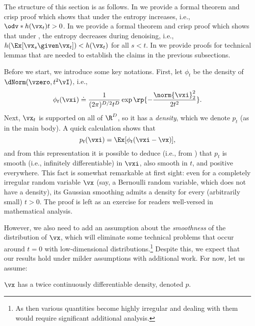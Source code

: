 \documentclass[../../book-main.tex]{subfiles}
\begin{document}
The structure of this section is as follows. In  we provide a formal theorem and crisp proof which shows that under  the entropy increases, i.e., \(\odv*{h(\vx_{t})}{t} > 0\). In  we provide a formal theorem and crisp proof which shows that under , the entropy decreases during denoising, i.e., \(h(\Ex[\vx_{s} \given \vx_{t}]) < h(\vx_{t})\) for all \(s < t\). In  we provide proofs for technical lemmas that are needed to establish the claims in the previous subsections.

Before we start, we introduce some key notations. First, let \(\phi_{t}\) be the density of \(\dNorm(\vzero, t^{2}\vI)\), i.e.,
\begin{equation}\label{eq:gaussian_noise_time_t}
    \phi_{t}(\vxi) \doteq \frac{1}{(2\pi)^{D/2}t^{D}}\exp\rp{-\frac{\norm{\vxi}_{2}^{2}}{2t^{2}}}.
\end{equation}
Next, \(\vx_{t}\) is supported on all of \(\R^{D}\), so it has a \textit{density}, which we denote \(p_{t}\) (as in the main body). A quick calculation shows that
\begin{equation}\label{eq:p_t_representation}
    p_{t}(\vxi) = \Ex[\phi_{t}(\vxi - \vx)],
\end{equation}
and from this representation it is possible to deduce (i.e., from ) that \(p_{t}\) is smooth (i.e., infinitely differentiable) in \(\vxi\), also smooth in \(t\), and positive everywhere. This fact is somewhat remarkable at first sight: even for a completely irregular random variable \(\vx\) (say, a Bernoulli random variable, which does not have a density), its Gaussian smoothing admits a density for every (arbitrarily small) \(t > 0\). The proof is left as an exercise for readers well-versed in mathematical analysis.

However, we also need to add an assumption about the \textit{smoothness} of the distribution of \(\vx\), which will eliminate some technical problems that occur around \(t = 0\) with low-dimensional distributions.\footnote{As then various quantities become highly irregular and dealing with them would require significant additional analysis.} Despite this, we expect that our results hold under milder assumptions with additional work. For now, let us assume:
\begin{assumption}\label{assumption:entropy_x_density}
    \(\vx\) has a twice continuously differentiable density, denoted \(p\).
\end{assumption}
\end{document}
